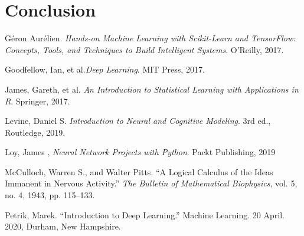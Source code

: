 \documentclass[12pt,letterpaper]{article}
\begin{document}

\section*{Conclusion}



\begin{thebibliography}{9}


Géron Aurélien. \textit{Hands-on Machine Learning with Scikit-Learn and TensorFlow: Concepts, Tools, and Techniques to Build Intelligent Systems}. O'Reilly, 2017.

Goodfellow, Ian, et al.\textit{Deep Learning}. MIT Press, 2017.

James, Gareth, et al. \textit{An Introduction to Statistical Learning with Applications in R}. Springer, 2017.

Levine, Daniel S. \textit{Introduction to Neural and Cognitive Modeling}. 3rd ed., Routledge, 2019.

Loy, James , \textit{Neural Network Projects with Python}. Packt Publishing, 2019

McCulloch, Warren S., and Walter Pitts. “A Logical Calculus of the Ideas Immanent in Nervous Activity.” \textit{The Bulletin of Mathematical Biophysics}, vol. 5, no. 4, 1943, pp. 115–133.

Petrik, Marek. “Introduction to Deep Learning.” Machine Learning. 20 April. 2020, Durham, New Hampshire.

\end{thebibliography}

\end{document}
